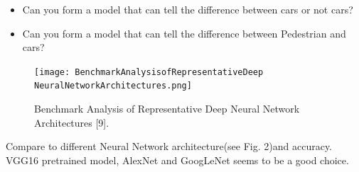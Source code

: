 \documentclass[10pt,journal,compsoc]{IEEEtran}
\begin{document}
\begin{itemize}
\item Can you form a model that can tell the difference between cars or not cars?
\item Can you form a model that can tell the difference between Pedestrian and cars?
\end {itemize}
\begin{figure}[thpb]
      \centering
      \texttt{[image: BenchmarkAnalysisofRepresentativeDeep NeuralNetworkArchitectures.png]}
      \caption{Benchmark Analysis of Representative
Deep Neural Network Architectures [9].}
      \label{fig:robot1}
\end{figure}
 Compare to different Neural Network architecture(see Fig. 2)and
 accuracy. VGG16 pretrained model, AlexNet and GoogLeNet seems to be a good choice.
\end{document}
